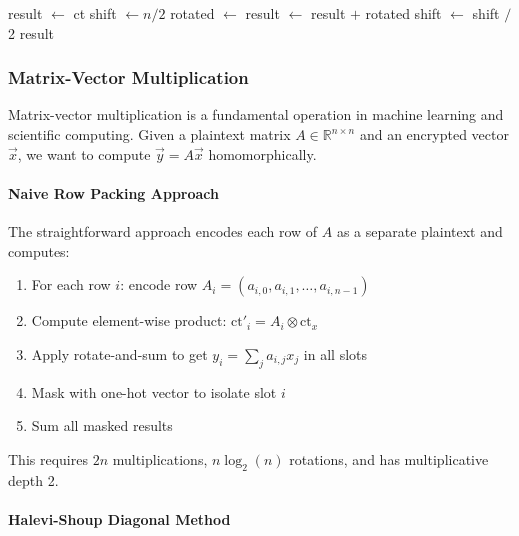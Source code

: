 \documentclass[11pt,a4paper]{article}
\begin{document}
\begin{algorithm}[H]
\caption{Encrypted Inner Product (Sum All Slots)}
\begin{algorithmic}[1]
    \State {}
    \State result $\gets$ ct
    \State shift $\gets n / 2$
        \State rotated $\gets$ 
        \State result $\gets$ result $+$ rotated
        \State shift $\gets$ shift $/$ 2
    \EndWhile
    \State \Return result 
\EndFunction
\end{algorithmic}
\end{algorithm}

\subsubsection{Matrix-Vector Multiplication}

Matrix-vector multiplication is a fundamental operation in machine learning and scientific computing. Given a plaintext matrix $A \in \mathbb{R}^{n \times n}$ and an encrypted vector $\vec{x}$, we want to compute $\vec{y} = A\vec{x}$ homomorphically.

\paragraph{Naive Row Packing Approach}

The straightforward approach encodes each row of $A$ as a separate plaintext and computes:

\begin{enumerate}
    \item For each row $i$: encode row $A_i = (a_{i,0}, a_{i,1}, \ldots, a_{i,n-1})$
    \item Compute element-wise product: $\text{ct}'_i = A_i \otimes \text{ct}_x$
    \item Apply rotate-and-sum to get $y_i = \sum_j a_{i,j} x_j$ in all slots
    \item Mask with one-hot vector to isolate slot $i$
    \item Sum all masked results
\end{enumerate}

This requires $2n$ multiplications, $n \log_2(n)$ rotations, and has multiplicative depth 2.

\paragraph{Halevi-Shoup Diagonal Method}
\end{document}

